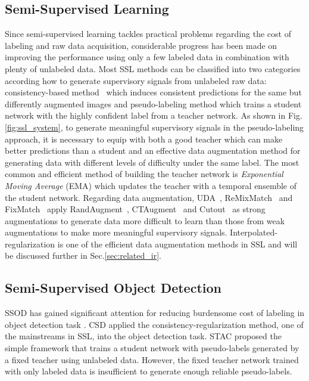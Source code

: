 \documentclass[10pt,twocolumn,letterpaper]{article}
\begin{document}
\subsection{Semi-Supervised Learning}
Since semi-supervised learning tackles practical problems regarding the cost of labeling and raw data acquisition, considerable progress has been made on improving the performance using only a few labeled data in combination with plenty of unlabeled data. 
Most SSL methods can be classified into two categories according how to generate supervisory signals from unlabeled raw data: consistency-based method~\cite{berthelot2019mixmatch, berthelot2019remixmatch, laine2016temporal, tarvainen2017mean, miyato2018virtual, xie2019unsupervised, verma2019interpolation} which induces consistent predictions for the same but differently augmented images and pseudo-labeling method\cite{lee2013pseudo, bachman2014learning, iscen2019label, arazo2020pseudo, xie2020self, sohn2020fixmatch} which trains a student network with the highly confident label from a teacher network.
As shown in Fig.\ref{fig:ssl_system}, to generate meaningful supervisory signals in the pseudo-labeling approach, it is necessary to equip with both a good teacher which can make better predictions than a student and an effective data augmentation method for generating data with different levels of difficulty under the same label. The most common and efficient method of building the teacher network is \textit{Exponential Moving Average} (EMA)\cite{tarvainen2017mean} which updates the teacher with a temporal ensemble of the student network.
Regarding data augmentation, UDA~\cite{xie2019unsupervised}, ReMixMatch~\cite{berthelot2019remixmatch} and FixMatch~\cite{sohn2020fixmatch} apply RandAugment~\cite{cubuk2019randaugment}, CTAugment~\cite{berthelot2019remixmatch} and Cutout~\cite{devries2017cutout} as strong augmentations to generate data more difficult to learn than those from weak augmentations to make more meaningful supervisory signals.
Interpolated-regularization is one of the efficient data augmentation methods in SSL and will be discussed further in Sec.\ref{sec:related_ir}.

\subsection{Semi-Supervised Object Detection}
SSOD has gained significant attention for reducing burdensome cost of labeling in object detection task \cite{wang2021data, yang2021interactive, zhou2021instant, sohn2020simple, Jeong_2021_CVPR, jeong2019consistency, liu2021unbiased}. CSD\cite{jeong2019consistency} applied the consistency-regularization method, one of the mainstreams in SSL, into the object detection task. STAC\cite{sohn2020simple} proposed the simple framework that trains a student network with pseudo-labels generated by a fixed teacher using unlabeled data.
However, the fixed teacher network trained with only labeled data is insufficient to generate enough reliable pseudo-labels.
\end{document}
